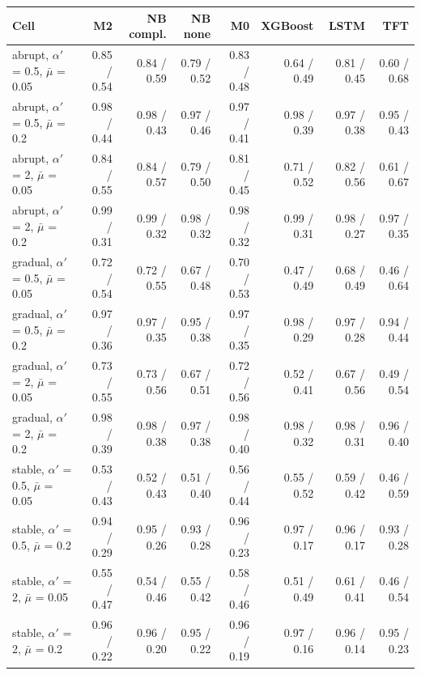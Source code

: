 \documentclass[10pt,a4paper]{article}
\begin{document}
\noindent\begin{minipage}{\linewidth}
\label{tab:S3b}
\centering\scriptsize
\begin{tabular}{lrrrrrrr}
\toprule
Cell & M2 & NB compl. & NB none & M0 & XGBoost & LSTM & TFT \\ \midrule
abrupt, $\alpha'$ = 0.5, $\bar{\mu}$ = 0.05 & 0.85 / 0.54 & 0.84 / 0.59 & 0.79 / 0.52 & 0.83 / 0.48 & 0.64 / 0.49 & 0.81 / 0.45 & 0.60 / 0.68 \\
abrupt, $\alpha'$ = 0.5, $\bar{\mu}$ = 0.2 & 0.98 / 0.44 & 0.98 / 0.43 & 0.97 / 0.46 & 0.97 / 0.41 & 0.98 / 0.39 & 0.97 / 0.38 & 0.95 / 0.43 \\
abrupt, $\alpha'$ = 2, $\bar{\mu}$ = 0.05 & 0.84 / 0.55 & 0.84 / 0.57 & 0.79 / 0.50 & 0.81 / 0.45 & 0.71 / 0.52 & 0.82 / 0.56 & 0.61 / 0.67 \\
abrupt, $\alpha'$ = 2, $\bar{\mu}$ = 0.2 & 0.99 / 0.31 & 0.99 / 0.32 & 0.98 / 0.32 & 0.98 / 0.32 & 0.99 / 0.31 & 0.98 / 0.27 & 0.97 / 0.35 \\
gradual, $\alpha'$ = 0.5, $\bar{\mu}$ = 0.05 & 0.72 / 0.54 & 0.72 / 0.55 & 0.67 / 0.48 & 0.70 / 0.53 & 0.47 / 0.49 & 0.68 / 0.49 & 0.46 / 0.64 \\
gradual, $\alpha'$ = 0.5, $\bar{\mu}$ = 0.2 & 0.97 / 0.36 & 0.97 / 0.35 & 0.95 / 0.38 & 0.97 / 0.35 & 0.98 / 0.29 & 0.97 / 0.28 & 0.94 / 0.44 \\
gradual, $\alpha'$ = 2, $\bar{\mu}$ = 0.05 & 0.73 / 0.55 & 0.73 / 0.56 & 0.67 / 0.51 & 0.72 / 0.56 & 0.52 / 0.41 & 0.67 / 0.56 & 0.49 / 0.54 \\
gradual, $\alpha'$ = 2, $\bar{\mu}$ = 0.2 & 0.98 / 0.39 & 0.98 / 0.38 & 0.97 / 0.38 & 0.98 / 0.40 & 0.98 / 0.32 & 0.98 / 0.31 & 0.96 / 0.40 \\
stable, $\alpha'$ = 0.5, $\bar{\mu}$ = 0.05 & 0.53 / 0.43 & 0.52 / 0.43 & 0.51 / 0.40 & 0.56 / 0.44 & 0.55 / 0.52 & 0.59 / 0.42 & 0.46 / 0.59 \\
stable, $\alpha'$ = 0.5, $\bar{\mu}$ = 0.2 & 0.94 / 0.29 & 0.95 / 0.26 & 0.93 / 0.28 & 0.96 / 0.23 & 0.97 / 0.17 & 0.96 / 0.17 & 0.93 / 0.28 \\
stable, $\alpha'$ = 2, $\bar{\mu}$ = 0.05 & 0.55 / 0.47 & 0.54 / 0.46 & 0.55 / 0.42 & 0.58 / 0.46 & 0.51 / 0.49 & 0.61 / 0.41 & 0.46 / 0.54 \\
stable, $\alpha'$ = 2, $\bar{\mu}$ = 0.2 & 0.96 / 0.22 & 0.96 / 0.20 & 0.95 / 0.22 & 0.96 / 0.19 & 0.97 / 0.16 & 0.96 / 0.14 & 0.95 / 0.23 \\
\bottomrule
\end{tabular}
\end{minipage}
\vspace{22pt}
\end{document}
